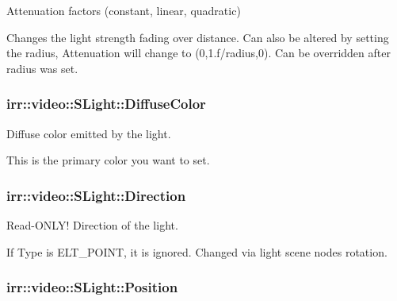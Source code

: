 Attenuation factors (constant, linear, quadratic) 

Changes the light strength fading over distance. Can also be altered by setting the radius, Attenuation will change to (0,1.\+f/radius,0). Can be overridden after radius was set. 
\subsubsection[{\texorpdfstring{Diffuse\+Color}{DiffuseColor}}]{ irr\+::video\+::\+S\+Light\+::\+Diffuse\+Color}\hypertarget{structirr_1_1video_1_1SLight_a226622e93aa1e249fe876fdb9d0186fe}{}\label{structirr_1_1video_1_1SLight_a226622e93aa1e249fe876fdb9d0186fe}


Diffuse color emitted by the light. 

This is the primary color you want to set. 
\subsubsection[{\texorpdfstring{Direction}{Direction}}]{ irr\+::video\+::\+S\+Light\+::\+Direction}\hypertarget{structirr_1_1video_1_1SLight_a226c488abec5696b995df6895ab42d41}{}\label{structirr_1_1video_1_1SLight_a226c488abec5696b995df6895ab42d41}


Read-\/\+O\+N\+L\+Y! Direction of the light. 

If Type is E\+L\+T\+\_\+\+P\+O\+I\+NT, it is ignored. Changed via light scene node\textquotesingle{}s rotation. 
\subsubsection[{\texorpdfstring{Position}{Position}}]{ irr\+::video\+::\+S\+Light\+::\+Position}\hypertarget{structirr_1_1video_1_1SLight_ac1f0fda0cc1780b09a2597adcfc9c946}{}\label{structirr_1_1video_1_1SLight_ac1f0fda0cc1780b09a2597adcfc9c946}


